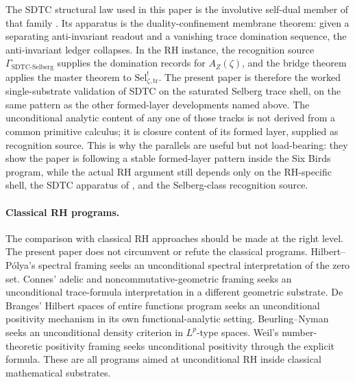 \documentclass[11pt]{article}
\newcommand{\AZ}{A_{Z}(\zeta)}
\newcommand{\Sel}{\mathrm{Sel}^{!}_{\zeta,\mathrm{tr}}}
\newcommand{\GamSDTCSelberg}{\Gamma_{\mathrm{SDTC\text{-}Selberg}}}
\theoremstyle{definition}
\begin{document}
The SDTC structural law used in this paper is the involutive
self-dual member of that family \cite{TsiokosSDTC2026}.  Its
apparatus is the duality-confinement membrane theorem: given a
separating anti-invariant readout and a vanishing trace domination
sequence, the anti-invariant ledger collapses.  In the RH instance,
the recognition source \(\GamSDTCSelberg\) supplies the domination
records for \(\AZ\), and the bridge theorem
 applies the
\cite{TsiokosSDTC2026} master theorem to \(\Sel\).  The present
paper is therefore the worked single-substrate validation of SDTC
on the saturated Selberg trace shell, on the same pattern as the
other formed-layer developments named above.  The unconditional
analytic content of any one of those tracks is not derived from a
common primitive calculus; it is closure content of its formed
layer, supplied as recognition source.  This is why the parallels
are useful but not load-bearing: they show the paper is following a
stable formed-layer pattern inside the Six Birds program, while the
actual RH argument still depends only on the RH-specific shell, the
SDTC apparatus of \citet{TsiokosSDTC2026}, and the Selberg-class
recognition source.

\paragraph{Classical RH programs.}
The comparison with classical RH approaches should be made at the
right level.  The present paper does not circumvent or refute the
classical programs.  Hilbert--P\'olya's spectral framing
\citep{BerryKeating1990} seeks an unconditional spectral
interpretation of the zero set.  Connes' adelic and
noncommutative-geometric framing \citep{Connes1999} seeks an
unconditional trace-formula interpretation in a different
geometric substrate.  De Branges' Hilbert spaces of entire functions
program \citep{deBranges1986} seeks an unconditional positivity
mechanism in its own functional-analytic setting.  Beurling--Nyman
\citep{Beurling1955,BaezDuarte2003} seeks an unconditional density
criterion in \(L^{p}\)-type spaces.  Weil's number-theoretic
positivity framing \citep{Weil1952,Bombieri2000} seeks
unconditional positivity through the explicit formula.  These are
all programs aimed at unconditional RH inside classical
mathematical substrates.
\end{document}
